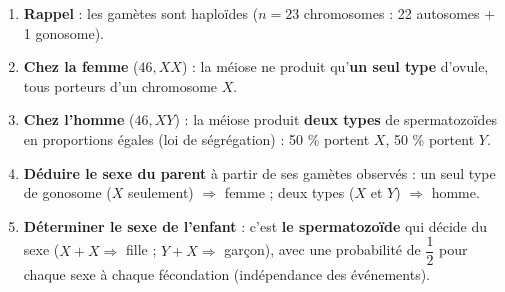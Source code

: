 \documentclass[11pt]{article}
\newcommand{\cle}[1]{{\popxbold\color{popdark}#1}}
\begin{document}
\begin{methode}
\begin{enumerate}
\item \textbf{Rappel} : les \cle{gamètes} sont haploïdes ($n = 23$ chromosomes : 22 autosomes + 1 gonosome).
\item \textbf{Chez la femme} ($46, XX$) : la méiose ne produit qu'\textbf{un seul type} d'ovule, tous porteurs d'un chromosome $X$.
\item \textbf{Chez l'homme} ($46, XY$) : la méiose produit \textbf{deux types} de spermatozoïdes en proportions égales (loi de ségrégation) : 50 \% portent $X$, 50 \% portent $Y$.
\item \textbf{Déduire le sexe du parent} à partir de ses gamètes observés : un seul type de gonosome ($X$ seulement) $\Rightarrow$ femme ; deux types ($X$ et $Y$) $\Rightarrow$ homme.
\item \textbf{Déterminer le sexe de l'enfant} : c'est \textbf{le spermatozoïde} qui décide du sexe ($X + X \Rightarrow$ fille ; $Y + X \Rightarrow$ garçon), avec une probabilité de $\dfrac{1}{2}$ pour chaque sexe à chaque fécondation (indépendance des événements).
\end{enumerate}
\end{methode}
\end{document}
